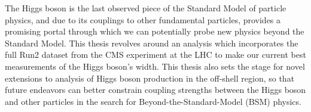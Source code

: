 

The Higgs boson is the last observed piece of the Standard Model of particle physics, and due to its couplings to other fundamental particles, provides a promising portal through which we can potentially probe new physics beyond the Standard Model. This thesis revolves around an analysis which incorporates the full Run2 dataset from the CMS experiment at the LHC to make our current best measurements of the Higgs boson's width. This thesis also sets the stage for novel extensions to analysis of Higgs boson production in the off-shell region, so that future endeavors can better constrain coupling strengths between the Higgs boson and other particles in the search for Beyond-the-Standard-Model (BSM) physics. 

\vspace{1in}


